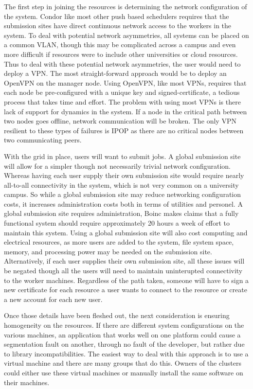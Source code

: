 \documentclass[conference]{IEEEtran}
\begin{document}
The first step in joining the resources is determining the network
configuration of the system.  Condor like most other push based schedulers
requires that the submission sites have direct continuous network access to the
workers in the system.  To deal with potential network asymmetries, all systems
can be placed on a common VLAN, though this may be complicated across a campus
and even more difficult if resources were to include other universities or
cloud resources.  Thus to deal with these potential network asymmetries, the
user would need to deploy a VPN.  The most straight-forward approach would be
to deploy an OpenVPN on the manager node.  Using OpenVPN, like most VPNs,
requires that each node be pre-configured with a unique key and
signed-certificate, a tedious process that takes time and effort.  The problem
with using most VPNs is there lack of support for dynamics in the system.  If a
node in the critical path between two nodes goes offline, network communication
will be broken.  The only VPN resilient to these types of failures is IPOP as
there are no critical nodes between two communicating peers.

With the grid in place, users will want to submit jobs.  A global submission
site will allow for a simpler though not necessarily trivial network
configuration.  Whereas having each user supply their own submission site would
require nearly all-to-all connectivity in the system, which is not very common
on a university campus.  So while a global submission site may reduce
networking configuration costs, it increases administration costs both in terms
of utilities and personel.  A global submission site requires administration,
Boinc makes claims that a fully functional system should require approximately
20 hours a week of effort to maintain this system.  Using a global submission
site will also cost computing and electrical resources, as more users are added
to the system, file system space, memory, and processing power may be needed on
the submission site.  Alternatively, if each user supplies their own submission
site, all these issues will be negated though all the users will need to
maintain uninterupted connectivity to the worker machines.  Regardless of the
path taken, someone will have to sign a new certificate for each resource a
user wants to connect to the resource or create a new account for each new
user.

Once those details have been fleshed out, the next consideration is ensuring
homogeneity on the resources.  If there are different system configurations on
the various machines, an application that works well on one platform could
cause a segmentation fault on another, through no fault of the developer, but
rather due to library incompatibilities.  The easiest way to deal with this
approach is to use a virtual machine and there are many groups that do this.
Owners of the clusters could either use these virtual machines or manually
install the same software on their machines.
\end{document}
